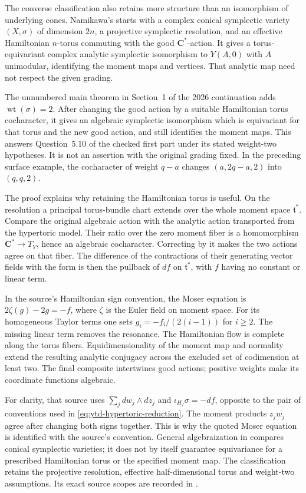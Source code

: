 The converse classification also retains more structure than an
isomorphism of underlying cones. Namikawa's
\cite[Theorem~5.8]{Namikawa25HypertoricCharacterizationV5}
starts with a complex conical symplectic variety $(X,\sigma)$ of
dimension $2n$, a projective symplectic resolution, and an effective
Hamiltonian $n$-torus commuting with the good $\mathbf C^*$-action.
It gives a torus-equivariant complex analytic symplectic isomorphism
to $Y(A,0)$ with $A$ unimodular, identifying the moment maps and
vertices. That analytic map need not respect the given grading.

The unnumbered main theorem in Section~1 of the 2026 continuation
\cite{Namikawa26HypertoricCharacterizationIIV2} adds
$\operatorname{wt}(\sigma)=2$. After changing the good action by
a suitable Hamiltonian torus cocharacter, it gives an algebraic
symplectic isomorphism which is equivariant for that torus and the
new good action, and still identifies the moment maps. This
answers Question~5.10 of the checked first part under its stated
weight-two hypotheses. It is not an assertion with the original
grading fixed. In the preceding surface example, the cocharacter
of weight $q-a$ changes $(a,2q-a,2)$ into $(q,q,2)$.

The proof explains why retaining the Hamiltonian torus is useful.
On the resolution a principal torus-bundle chart extends over
the whole moment space $\mathfrak t^*$. Compare the original
algebraic action with the analytic action transported from the
hypertoric model. Their ratio over the zero moment fiber is a
homomorphism $\mathbf C^*\to T_Y$, hence an algebraic cocharacter.
Correcting by it makes the two actions agree on that fiber.
The difference of the contractions of their generating vector
fields with the form is then the pullback of $df$ on
$\mathfrak t^*$, with $f$ having no constant or linear term.

In the source's Hamiltonian sign convention, the Moser equation
is $2\zeta(g)-2g=-f$, where $\zeta$ is the Euler field on
moment space. For its homogeneous Taylor terms one sets
$g_i=-f_i/(2(i-1))$ for $i\geq2$. The missing linear term
removes the resonance. The Hamiltonian flow is complete along
the torus fibers. Equidimensionality of the moment map and
normality extend the resulting analytic conjugacy across the
excluded set of codimension at least two. The final composite
intertwines good actions; positive weights make its coordinate
functions algebraic.

For clarity, that source uses $\sum_j dw_j\wedge dz_j$ and
$\iota_{H_f}\sigma=-df$, opposite to the pair of conventions
used in \eqref{eq:ytd-hypertoric-reduction}. The moment products
$z_jw_j$ agree after changing both signs together. This is why
the quoted Moser equation is identified with the source's
convention. General algebraization in
 compares conical
symplectic varieties; it does not by itself guarantee equivariance
for a prescribed Hamiltonian torus or the specified moment map.
The classification retains the projective resolution, effective
half-dimensional torus and weight-two assumptions. Its exact
source scopes are recorded in
.

